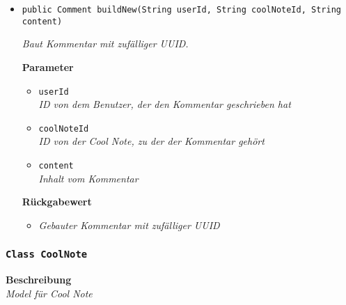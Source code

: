 \begin{itemize}
     \item{\texttt{public Comment buildNew(String userId, String coolNoteId, String content)}}
     	
     	\textit{Baut Kommentar mit zufälliger UUID.}
     	
     	\textbf{Parameter}
     	\begin{itemize}
     		\item\texttt{userId}\\
     		\textit{ID von dem Benutzer, der den Kommentar geschrieben hat} 
     		\item\texttt{coolNoteId}\\
     		\textit{ID von der Cool Note, zu der der Kommentar gehört} 
     		\item\texttt{content}\\
     		\textit{Inhalt vom Kommentar}
     	\end{itemize}
     	
     	\textbf{Rückgabewert}
     	\begin{itemize}
     		\item\textit{Gebauter Kommentar mit zufälliger UUID}
     	\end{itemize}
     \end{itemize}
 
     \subsubsection{\texttt{Class CoolNote}}
     \textbf{Beschreibung} \\
     \textit{Model für Cool Note}
